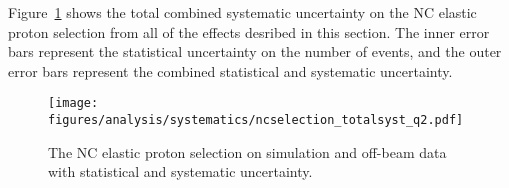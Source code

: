     Figure~\ref{fig:systall} shows the total combined systematic uncertainty on
    the NC elastic proton selection from all of the effects desribed in this
    section. The inner error bars represent the statistical uncertainty on the
    number of events, and the outer error bars represent the combined
    statistical and systematic uncertainty.
    \begin{figure}[ht]
      \centering
      \texttt{[image: figures/analysis/systematics/ncselection\_totalsyst\_q2.pdf]}
      \caption{The NC elastic proton selection on simulation and off-beam data
      with statistical and systematic uncertainty.}
      \label{fig:systall}
    \end{figure}


